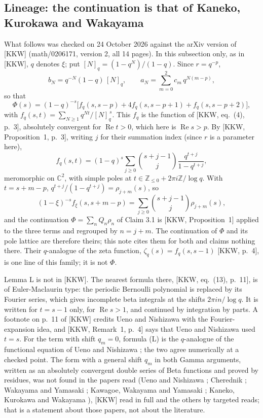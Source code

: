 \documentclass[11pt]{article}
\newcommand{\re}{\operatorname{Re}}
\begin{document}
\subsection{Lineage: the continuation is that of Kaneko, Kurokawa and Wakayama}\label{sec:lineage}

What follows was checked on 24 October 2026 against the arXiv version of [KKW] (math/0206171, version 2, all 14 pages). In this subsection only, as in [KKW], $q$ denotes $\xi$; put $[N]_q=(1-q^N)/(1-q)$. Since $r=q^{-p}$,
\[
b_N=q^{-N}(1-q)\,[N]_q,\qquad a_N=\sum_{m=0}^{2}c_m\,q^{N(m-p)},
\]
so that
\[
\Phi(s)=(1-q)^{-s}\bigl[f_q(s,s-p)+4f_q(s,s-p+1)+f_q(s,s-p+2)\bigr],
\]
with $f_q(s,t)=\sum_{N\ge1}q^{Nt}/[N]_q^{\,s}$. This $f_q$ is the function of [KKW, eq.~(4), p.~3], absolutely convergent for $\re t>0$, which here is $\re s>p$. By [KKW, Proposition~1, p.~3], writing $j$ for their summation index (since $r$ is a parameter here),
\[
f_q(s,t)=(1-q)^s\sum_{j\ge0}\binom{s+j-1}{j}\frac{q^{t+j}}{1-q^{t+j}},
\]
meromorphic on $\mathbb{C}^2$, with simple poles at $t\in\mathbb{Z}_{\le0}+2\pi i\mathbb{Z}/\log q$. With $t=s+m-p$, $q^{t+j}/(1-q^{t+j})=\rho_{j+m}(s)$, so
\[
(1-\xi)^{-s}f_\xi(s,s+m-p)=\sum_{j\ge0}\binom{s+j-1}{j}\rho_{j+m}(s),
\]
and the continuation $\Phi=\sum_nQ_n\rho_n$ of Claim 3.1 is [KKW, Proposition~1] applied to the three terms and regrouped by $n=j+m$. The continuation of $\Phi$ and its pole lattice are therefore theirs; this note cites them for both and claims nothing there. Their $q$-analogue of the zeta function, $\zeta_q(s)=f_q(s,s-1)$ [KKW, p.~4], is one line of this family; it is not $\Phi$.

Lemma L is not in [KKW]. The nearest formula there, [KKW, eq.~(13), p.~11], is of Euler-Maclaurin type: the periodic Bernoulli polynomial is replaced by its Fourier series, which gives incomplete beta integrals at the shifts $2\pi in/\log q$. It is written for $t=s-1$ only, for $\re s>1$, and continued by integration by parts. A footnote on p.~11 of [KKW] credits Ueno and Nishizawa with the Fourier-expansion idea, and [KKW, Remark~1, p.~4] says that Ueno and Nishizawa used $t=s$. For the term with shift $q_m=0$, formula (L) is the $q$-analogue of the functional equation of Ueno and Nishizawa \cite[Theorem~3, eq.~(32) together with eq.~(27), at $z=1$]{UN}; the two agree numerically at a checked point. The form with a general shift $q_m$ in both Gamma arguments, written as an absolutely convergent double series of Beta functions and proved by residues, was not found in the papers read (Ueno and Nishizawa \cite{UN}; Cherednik \cite{Ch}; Wakayama and Yamasaki \cite{WY}; Kawagoe, Wakayama and Yamasaki \cite{KWY}; Kaneko, Kurokawa and Wakayama \cite{KKW}), [KKW] read in full and the others by targeted reads; that is a statement about those papers, not about the literature.
\end{document}
